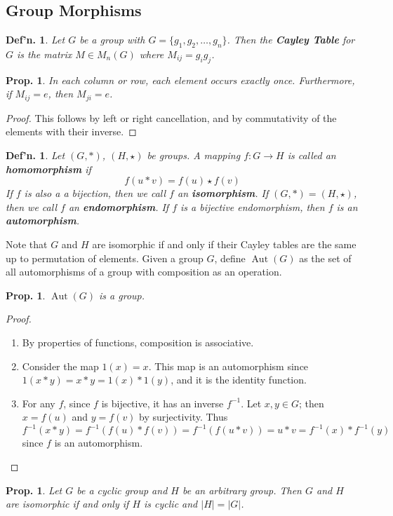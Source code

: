 \documentclass[12pt, a4paper]{book}
\DeclareMathOperator{\aut}{Aut}
\newtheorem{definition}[theorem]{Def'n.}
\newtheorem{proposition}[theorem]{Prop.}
\theoremstyle{nonumberplain}
\newtheorem{proof}{Proof}
\begin{document}
\subsection{Group Morphisms}
\begin{definition}
    Let $G$ be a group with $G=\{g_1,g_2,\ldots,g_n\}$.
    Then the \textbf{Cayley Table} for $G$ is the matrix $M\in M_n(G)$ where $M_{ij}=g_ig_j$.
\end{definition}
\begin{proposition}
    In each column or row, each element occurs exactly once.
    Furthermore, if $M_{ij}=e$, then $M_{ji}=e$.
\end{proposition}
\begin{proof}
    This follows by left or right cancellation, and by commutativity of the elements with their inverse.
\end{proof}
\begin{definition}
    Let $(G,*)$, $(H,\star)$ be groups.
    A mapping $f:G\to H$ is called an \textbf{homomorphism} if
    \[f(u*v)=f(u)\star f(v)\]
    If $f$ is also a a bijection, then we call $f$ an \textbf{isomorphism}.
    If $(G,*)=(H,\star)$, then we call $f$ an \textbf{endomorphism}.
    If $f$ is a bijective endomorphism, then $f$ is an \textbf{automorphism}.
\end{definition}
Note that $G$ and $H$ are isomorphic if and only if their Cayley tables are the same up to permutation of elements.
Given a group $G$, define $\aut(G)$ as the set of all automorphisms of a group with composition as an operation.
\begin{proposition}
    $\aut(G)$ is a group.
\end{proposition}
\begin{proof}
    \begin{enumerate}[nolistsep]
        \item By properties of functions, composition is associative.
        \item Consider the map $1(x)=x$.
            This map is an automorphism since $1(x*y)=x*y=1(x)*1(y)$, and it is the identity function.
        \item For any $f$, since $f$ is bijective, it has an inverse $f^{-1}$.
            Let $x,y\in G$; then $x=f(u)$ and $y=f(v)$ by surjectivity.
            Thus $f^{-1}(x*y)=f^{-1}(f(u)*f(v))=f^{-1}(f(u*v))=u*v=f^{-1}(x)*f^{-1}(y)$ since $f$ is an automorphism.
    \end{enumerate}
\end{proof}
\begin{proposition}
    Let $G$ be a cyclic group and $H$ be an arbitrary group.
    Then $G$ and $H$ are isomorphic if and only if $H$ is cyclic and $|H|=|G|$.
\end{proposition}
\end{document}

